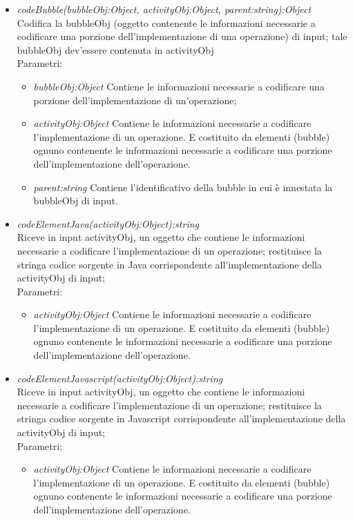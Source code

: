 \documentclass[../DefinizioneDiProdotto.tex]{subfiles}
\begin{document}
\begin{itemize}
\begin{itemize}
					\item \emph{codeBubble(bubbleObj:Object, activityObj:Object, parent:string):Object} \\ 
					Codifica la bubbleObj (oggetto contenente le informazioni necessarie a codificare una porzione dell'implementazione di una operazione) di input; tale bubbleObj dev'essere contenuta in activityObj \\
					Parametri:
					\begin{itemize}
						\item \emph{bubbleObj:Object} Contiene le informazioni necessarie a codificare una porzione dell'implementazione di un'operazione;
						\item \emph{activityObj:Object} Contiene le informazioni necessarie a codificare l'implementazione di un operazione. E costituito da elementi (bubble) ognuno contenente le informazioni necessarie a codificare una porzione dell'implementazione dell'operazione.
						\item \emph{parent:string} Contiene l'identificativo della bubble in cui è innestata la bubbleObj di input.
					\end{itemize}
					
					\item \emph{codeElementJava(activityObj:Object):string} \\ 
					Riceve in input activityObj, un oggetto che contiene le informazioni necessarie a codificare l'implementazione di un operazione; 
					restituisce la stringa codice sorgente in Java corrispondente all'implementazione della activityObj di input; \\
					Parametri:
					\begin{itemize}
						\item \emph{activityObj:Object} Contiene le informazioni necessarie a codificare l'implementazione di un operazione. E costituito da elementi (bubble) ognuno contenente le informazioni necessarie a codificare una porzione dell'implementazione dell'operazione.
					\end{itemize}
					
					
					\item \emph{codeElementJavascript(activityObj:Object):string} \\ 
					Riceve in input activityObj, un oggetto che contiene le informazioni necessarie a codificare l'implementazione di un operazione; 
					restituisce la stringa codice sorgente in Javascript corrispondente all'implementazione della activityObj di input; \\
					Parametri:
					\begin{itemize}
						\item \emph{activityObj:Object} Contiene le informazioni necessarie a codificare l'implementazione di un operazione. E costituito da elementi (bubble) ognuno contenente le informazioni necessarie a codificare una porzione dell'implementazione dell'operazione.
					\end{itemize}
				\end{itemize}
				

\end{itemize}
\end{document}

